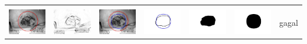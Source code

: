 \begin{table}[H]
\begin{tabular}{|m{0.7in}|m{0.7in}|m{0.7in}|m{0.7in}|m{0.7in}|m{0.7in}|m{0.7in}|}
		&  &  & & & &  \\
		\includegraphics[width=0.7in]{dataset/dataset_3/luka_hitam/ready/33_integer_init.jpg}&
		\includegraphics[width=0.7in]{dataset/dataset_3/luka_hitam/ready/33_integer_ext.jpg}&
		\includegraphics[width=0.7in]{dataset/dataset_3/luka_hitam/ready/33_integer_result.jpg}&
		\includegraphics[width=0.7in]{dataset/dataset_3/luka_hitam/ready/33_gt_r_integer.jpg}&
		\includegraphics[width=0.7in]{dataset/dataset_3/luka_hitam/ready/33_r.jpg}&
		\includegraphics[width=0.7in]{dataset/dataset_3/luka_hitam/ready/33_integer_r.jpg}&
		gagal\\
		\hline
		

\end{tabular}
\end{table}
